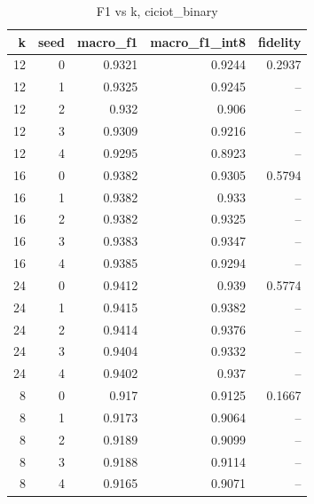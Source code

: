 \begin{table}
\caption{F1 vs k, ciciot_binary}
\begin{tabular}{rrrrr}
\toprule
k & seed & macro_f1 & macro_f1_int8 & fidelity \\
\midrule
12 & 0 & 0.9321 & 0.9244 & 0.2937 \\
12 & 1 & 0.9325 & 0.9245 & -- \\
12 & 2 & 0.932 & 0.906 & -- \\
12 & 3 & 0.9309 & 0.9216 & -- \\
12 & 4 & 0.9295 & 0.8923 & -- \\
16 & 0 & 0.9382 & 0.9305 & 0.5794 \\
16 & 1 & 0.9382 & 0.933 & -- \\
16 & 2 & 0.9382 & 0.9325 & -- \\
16 & 3 & 0.9383 & 0.9347 & -- \\
16 & 4 & 0.9385 & 0.9294 & -- \\
24 & 0 & 0.9412 & 0.939 & 0.5774 \\
24 & 1 & 0.9415 & 0.9382 & -- \\
24 & 2 & 0.9414 & 0.9376 & -- \\
24 & 3 & 0.9404 & 0.9332 & -- \\
24 & 4 & 0.9402 & 0.937 & -- \\
8 & 0 & 0.917 & 0.9125 & 0.1667 \\
8 & 1 & 0.9173 & 0.9064 & -- \\
8 & 2 & 0.9189 & 0.9099 & -- \\
8 & 3 & 0.9188 & 0.9114 & -- \\
8 & 4 & 0.9165 & 0.9071 & -- \\
\bottomrule
\end{tabular}
\end{table}
